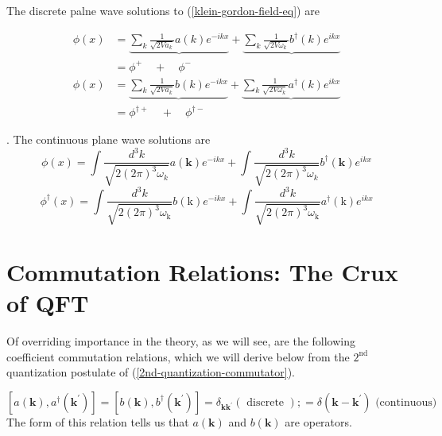 The discrete palne wave solutions to (\ref{klein-gordon-field-eq}) are
\begin{qt}
    \begin{equation}
\begin{aligned}
\phi(x) &=\underbrace{\sum_{k} \frac{1}{\sqrt{2 V a_{k}}} a(k) e^{-i k x}}+\underbrace{\sum_{k} \frac{1}{\sqrt{2 V \omega_{k}}} b^{\dagger}(k) e^{i k x}} \\
&=\phi^{+} \quad+\quad \phi^{-}
\end{aligned}
\label{solution-klein-gordon-field-eq1}
\end{equation}
    \begin{equation}
\begin{aligned}
\phi(x) &=\underbrace{\sum_{k} \frac{1}{\sqrt{2 V a_{k}}} b(k) e^{-i k x}}+\underbrace{\sum_{k} \frac{1}{\sqrt{2 V \omega_{k}}} a^{\dagger}(k) e^{i k x}} \\
&=\phi^{\dagger+} \quad+\quad \phi^{\dagger-}
\end{aligned}
\label{solution-klein-gordon-field-eq2}
\end{equation}
\end{qt}
. The continuous plane wave solutions are
\begin{equation}
\phi(x)=\int \frac{d^{3} k}{\sqrt{2(2 \pi)^{3} \omega_{k}}} a(\mathbf{k}) e^{-i k x}+\int \frac{d^{3} k}{\sqrt{2(2 \pi)^{3} \omega_{k}}} b^{\dagger}(\mathbf{k}) e^{i k x}
\end{equation}
\begin{equation}
\phi^{\dagger}(x)=\int \frac{d^{3} k}{\sqrt{2(2 \pi)^{3} \omega_{\mathrm{k}}}} b(\mathrm{k}) e^{-i k x}+\int \frac{d^{3} k}{\sqrt{2(2 \pi)^{3} \omega_{\mathrm{k}}}} a^{\dagger}(\mathrm{k}) e^{i k x}
\end{equation}

\section{Commutation Relations: The Crux of QFT}
Of overriding importance in the theory, as we will see, are the following coefficient commutation relations, which we will derive below from the $2^{\text {nd }}$ quantization postulate of (\ref{2nd-quantization-commutator}).
\begin{qt}
    \begin{equation}
\left[a(\mathbf{k}), a^{\dagger}\left(\mathbf{k}^{\prime}\right)\right]=\left[b(\mathbf{k}), b^{\dagger}\left(\mathbf{k}^{\prime}\right)\right]=\delta_{\mathbf{k} \mathbf{k}^{\prime}}(\text { discrete }) ; =\delta\left(\mathbf{k}-\mathbf{k}^{\prime}\right) \text { (continuous) }
\label{coefficient-commutator-klain-gordon-solution}
\end{equation}
The form of this relation tells us that $a(\mathbf{k})$ and $b(\mathbf{k})$ are operators.
\end{qt}
